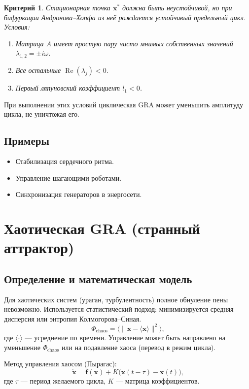 \documentclass[12pt,a4paper]{article}
\newtheorem{criteria}{Критерий}
\begin{document}
\begin{criteria}
Стационарная точка \(\mathbf{x}^*\) должна быть неустойчивой, но при бифуркации Андронова–Хопфа из неё рождается устойчивый предельный цикл. Условия:
\begin{enumerate}
    \item Матрица \(A\) имеет простую пару чисто мнимых собственных значений \(\lambda_{1,2}=\pm i\omega\).
    \item Все остальные \(\operatorname{Re}(\lambda_j)<0\).
    \item Первый ляпуновский коэффициент \(l_1 < 0\).
\end{enumerate}
\end{criteria}

При выполнении этих условий циклическая GRA может уменьшить амплитуду цикла, не уничтожая его.

\subsection{Примеры}
\begin{itemize}
    \item Стабилизация сердечного ритма.
    \item Управление шагающими роботами.
    \item Синхронизация генераторов в энергосети.
\end{itemize}

\section{Хаотическая GRA (странный аттрактор)}

\subsection{Определение и математическая модель}

Для хаотических систем (ураган, турбулентность) полное обнуление пены невозможно. Используется статистический подход: минимизируется средняя дисперсия или энтропия Колмогорова–Синая.
\[
\Phi_{\text{chaos}} = \langle \|\mathbf{x} - \langle \mathbf{x} \rangle \|^2 \rangle,
\]
где \(\langle \cdot \rangle\) — усреднение по времени. Управление может быть направлено на уменьшение \(\Phi_{\text{chaos}}\) или на подавление хаоса (перевод в режим цикла).

Метод управления хаосом (Пырагас):
\[
\dot{\mathbf{x}} = \mathbf{f}(\mathbf{x}) + K\bigl( \mathbf{x}(t-\tau) - \mathbf{x}(t) \bigr),
\]
где \(\tau\) — период желаемого цикла, \(K\) — матрица коэффициентов.
\end{document}
